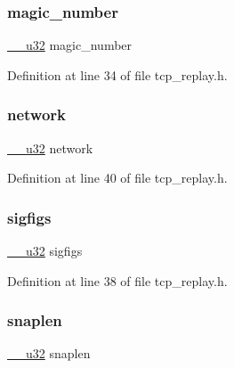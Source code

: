 \subsubsection{\texorpdfstring{magic\+\_\+number}{magic\_number}}
{\footnotesize\ttfamily \hyperlink{asm__types_8h_a3acae9310e2c2e411e800a8a369171c6}{\+\_\+\+\_\+u32} magic\+\_\+number}



Definition at line 34 of file tcp\+\_\+replay.\+h.

\mbox{\label{structpcap__hdr_ad2db71f5c9eda2cbdec7bb905865c79e}} 
\subsubsection{\texorpdfstring{network}{network}}
{\footnotesize\ttfamily \hyperlink{asm__types_8h_a3acae9310e2c2e411e800a8a369171c6}{\+\_\+\+\_\+u32} network}



Definition at line 40 of file tcp\+\_\+replay.\+h.

\mbox{\label{structpcap__hdr_a981136e35d46d41c5ae12d3783aebc92}} 
\subsubsection{\texorpdfstring{sigfigs}{sigfigs}}
{\footnotesize\ttfamily \hyperlink{asm__types_8h_a3acae9310e2c2e411e800a8a369171c6}{\+\_\+\+\_\+u32} sigfigs}



Definition at line 38 of file tcp\+\_\+replay.\+h.

\mbox{\label{structpcap__hdr_a9cc0121b72d0130a1f05388026a15213}} 
\subsubsection{\texorpdfstring{snaplen}{snaplen}}
{\footnotesize\ttfamily \hyperlink{asm__types_8h_a3acae9310e2c2e411e800a8a369171c6}{\+\_\+\+\_\+u32} snaplen}



